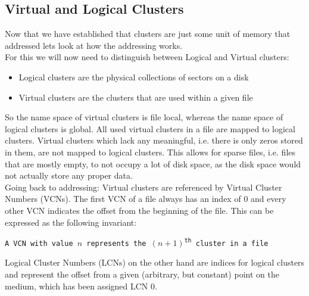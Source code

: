 \subsection{Virtual and Logical Clusters}
Now that we have established that clusters are just some unit of memory that addressed lets look at how the addressing works. \\
For this we will now need to distinguish between Logical and Virtual clusters:
\begin{itemize}
	\item Logical clusters are the physical collections of sectors on a disk 
	\item Virtual clusters are the clusters that are used within a given file
\end{itemize}
So the name space of virtual clusters is file local, whereas the name space of logical clusters is global. 
All used virtual clusters in a file are mapped to logical clusters. Virtual clusters which lack any meaningful, i.e. there is only zeros stored in them,  are not mapped to logical clusters. 
This allows for sparse files, i.e. files that are mostly empty, to not occupy a lot of disk space, as the disk space would not actually store any proper data.\\
Going back to addressing: Virtual clusters are referenced by Virtual Cluster Numbers (VCNs). The first VCN of a file always has an index of $0$ and every other VCN indicates the offset from the beginning of the file. This can be expressed as the following invariant:
\begin{center}
\texttt{A VCN with value $n$ represents the $(n+1)$\textsuperscript{th} cluster in a file}\\
\end{center}
Logical Cluster Numbers (LCNs) on the other hand are indices for logical clusters and represent the offset from a given (arbitrary, but constant) point on the medium, which has been assigned LCN $0$.\cite{RUSSINOVICH_ET_AL:2012:WI}